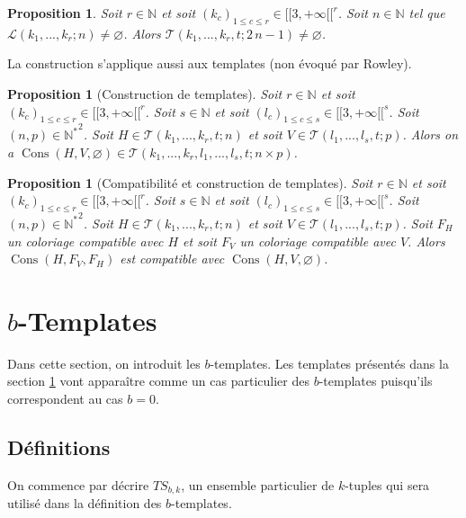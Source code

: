 \documentclass{article}
\newtheorem{proposition}[definition]{Proposition}
\DeclareMathOperator{\cons}{Cons}
\newcommand{\TS}{\mathit{TS}}
\begin{document}
\begin{proposition}
Soit \(r \in \mathbb{N}\) et soit \((k_c)_{1 \leqslant c \leqslant r} \in {[\![3, +\infty[\![}^r\). Soit \(n \in \mathbb{N}\) tel que \(\mathcal{L}(k_1, ..., k_r; n) \neq \varnothing\). Alors \(\mathcal{T}(k_1, ..., k_r, t; 2 \, n - 1) \neq \varnothing\).
\end{proposition}

La construction s'applique aussi aux templates (non évoqué par Rowley).

\begin{proposition}[Construction de templates]
Soit \(r \in \mathbb{N}\) et soit \((k_c)_{1 \leqslant c \leqslant r} \in {[\![3, +\infty[\![}^r\). Soit \(s \in \mathbb{N}\) et soit \((l_c)_{1 \leqslant c \leqslant s} \in {[\![3, +\infty[\![}^s\). Soit \((n, p) \in {\mathbb{N}^*}^2\). Soit \(H \in \mathcal{T}(k_1, ..., k_r, t; n)\) et soit \(V \in \mathcal{T}(l_1, ..., l_s, t; p)\). Alors on a \(\cons(H, V, \varnothing) \in \mathcal{T}(k_1, ..., k_r, l_1, ..., l_s, t; n \times p)\).
\end{proposition}

\begin{proposition}[Compatibilité et construction de templates]
Soit \(r \in \mathbb{N}\) et soit \((k_c)_{1 \leqslant c \leqslant r} \in {[\![3, +\infty[\![}^r\). Soit \(s \in \mathbb{N}\) et soit \((l_c)_{1 \leqslant c \leqslant s} \in {[\![3, +\infty[\![}^s\). Soit \((n, p) \in {\mathbb{N}^*}^2\). Soit \(H \in \mathcal{T}(k_1, ..., k_r, t; n)\) et soit \(V \in \mathcal{T}(l_1, ..., l_s, t; p)\). Soit \(F_H\) un coloriage compatible avec \(H\) et  soit \(F_V\) un coloriage compatible avec \(V\).
Alors  \(\cons(H, F_V, F_H)\) est compatible avec \(\cons(H, V, \varnothing)\).
\end{proposition}

\section{\(b\)-Templates}
\label{sec:b-temp}
Dans cette section, on introduit les \(b\)-templates. Les templates présentés dans la section \ref{sec:b-temp} vont apparaître comme un cas particulier des \(b\)-templates puisqu'ils correspondent au cas \(b = 0\).

\subsection{Définitions}
On commence par décrire \(\TS_{b,k}\), un ensemble particulier de \(k\)-tuples qui sera utilisé dans la définition des \(b\)-templates.
\end{document}
